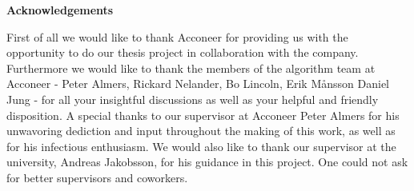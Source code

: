 \newenvironment{acknowledgements}%
    {\cleardoublepage\thispagestyle{empty}\null\vfill\begin{center}%
    \bfseries{\textsf{Acknowledgements}}\end{center}}
    {\vfill\null}
        \begin{acknowledgements}	
	First of all we would like to thank Acconeer for providing us with the opportunity to do our thesis project in collaboration with the company. Furthermore we would like to thank the members of the algorithm team at Acconeer - Peter Almers, Rickard Nelander, Bo Lincoln, Erik Månsson Daniel Jung - for all your insightful discussions as well as your helpful and friendly disposition. A special thanks to our supervisor at Acconeer Peter Almers for his unwavoring dediction and input throughout the making of this work, as well as for his infectious enthusiasm. We would also like to thank our supervisor at the university, Andreas Jakobsson, for his guidance in this project. One could not ask for better supervisors and coworkers.
        \end{acknowledgements}
